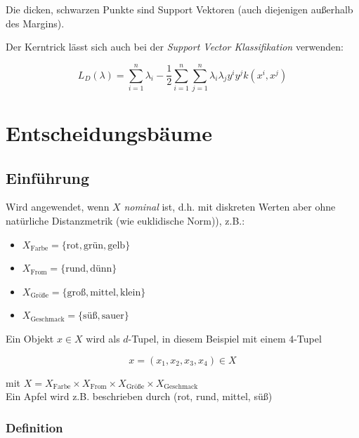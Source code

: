 \documentclass{report}
\begin{document}
  Die dicken, schwarzen Punkte sind Support Vektoren (auch diejenigen außerhalb des Margins).	
  
  Der Kerntrick lässt sich auch bei der \textit{Support Vector Klassifikation} verwenden:	
  
  $$L_D(\lambda) = \sum_{i=1}^n\lambda_i - \frac{1}{2}\sum_{i=1}^n\sum_{j=1}^n\lambda_i\lambda_jy^iy^jk(x^i, x^j)$$	
  
  \chapter{Entscheidungsbäume}	
  
  \section{Einführung}	
  
  Wird angewendet, wenn $X$ \textit{nominal} ist, d.h. mit diskreten Werten aber ohne	
  natürliche Distanzmetrik  (wie euklidische Norm)), z.B.:\\	
  \vspace*{-1.5em}	
  \begin{itemize}	
    \item $X_{\text{Farbe}} = \{\text{rot}, \text{grün}, \text{gelb}\}$	
    \item $X_{\text{From}} = \{\text{rund}, \text{dünn}\}$	
    \item $X_{\text{Größe}} = \{\text{groß}, \text{mittel}, \text{klein}\}$	
    \item $X_{\text{Geschmack}} = \{\text{süß}, \text{sauer}\}$	
  \end{itemize}	
  
  Ein Objekt $x\in X$ wird als $d$-Tupel, in diesem Beispiel mit einem $4$-Tupel	
  
  $$x = (x_1, x_2, x_3, x_4)\in X$$	
  
  mit $X = X_{\text{Farbe}} \times X_{\text{From}} \times X_{\text{Größe}} \times X_{\text{Geschmack}}$\\	
  Ein Apfel wird z.B. beschrieben durch (rot, rund, mittel, süß)	
  
  \subsection{Definition}	
  
\end{document}
